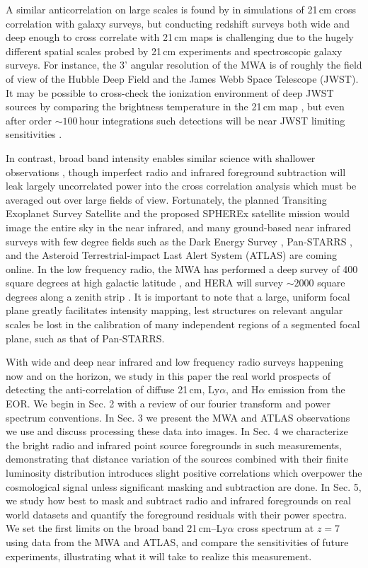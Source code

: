 \documentclass{emulateapj}
\begin{document}
A similar anticorrelation on large scales is found by \citet{lidz09,park14} in simulations of 21\,cm cross correlation with galaxy surveys, but conducting redshift surveys both wide and deep enough to cross correlate with 21\,cm maps is challenging due to the hugely different spatial scales probed by 21\,cm experiments and spectroscopic galaxy surveys. For instance, the 3' angular resolution of the MWA is of roughly the field of view of the Hubble Deep Field and the James Webb Space Telescope (JWST). It may be possible to cross-check the ionization environment of deep JWST sources by comparing the brightness temperature in the 21\,cm map \citep{beardsley15}, but even after order $\sim100$\,hour integrations such detections will be near JWST limiting sensitivities \citet{zackrisson11}.

In contrast, broad band intensity enables similar science with shallower observations \citep{StarsAndReionization,mao14}, though imperfect radio and infrared foreground subtraction will leak largely uncorrelated power into the cross correlation analysis which must be averaged out over large fields of view. Fortunately, the planned Transiting Exoplanet Survey Satellite \citep{ricker14} and the proposed SPHEREx satellite mission \citep{ScienceWithSpherex,SpherexWhitePaper} would image the entire sky in the near infrared, and many ground-based near infrared surveys with few degree fields such as the Dark Energy Survey \citep{des16}, Pan-STARRS \citep{tonry12}, and the Asteroid Terrestrial-impact Last Alert System (ATLAS) \citep{tonry11} are coming online. In the low frequency radio, the MWA has performed a deep survey of 400 square degrees at high galactic latitude \citep{beardsley16}, and HERA will survey $\sim2000$ square degrees along a zenith strip \citep{dillonmapmaking}. It is important to note that a large, uniform focal plane greatly facilitates intensity mapping, lest structures on relevant angular scales be lost in the calibration of many independent regions of a segmented focal plane, such as that of Pan-STARRS.

With wide and deep near infrared and low frequency radio surveys happening now 
and on the horizon, we study in this paper the real world prospects of detecting the
 anti-correlation of diffuse 21\,cm, Ly$\alpha$, and H$\alpha$ emission from the EOR.
  We begin in Sec. 2 with a review of our fourier transform and power spectrum conventions.
  In Sec. 3 we present the MWA and ATLAS observations we use and discuss processing these data into images. 
   In Sec. 4 we characterize the bright radio and infrared point source foregrounds in such measurements, 
   demonstrating that distance variation of the sources combined with
   their finite luminosity distribution introduces slight positive correlations which overpower the cosmological signal
   unless significant masking and subtraction are done. 
   In Sec. 5, we study how best to mask and subtract radio and infrared foregrounds on real world datasets and 
   quantify the foreground residuals with their power spectra. We set the first limits 
   on the broad band  21\,cm--Ly$\alpha$ cross spectrum at $z=7$ using data from the MWA
     and ATLAS, and compare the sensitivities of future experiments, 
     illustrating what it will take to realize this measurement.
\end{document}
